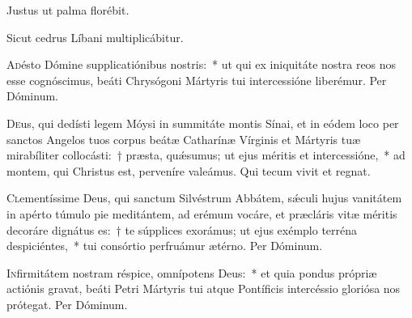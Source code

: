 \documentclass[vesperale_romanum]{subfiles}
\begin{document}



\vv Justus ut palma florébit.

\rr Sicut cedrus Líbani multiplicábitur.



\oratio
\lettrine{A}{d}ésto Dómine supplicatiónibus nostris:~* ut qui ex iniquitáte nostra reos nos esse cognóscimus, beáti Chrysógoni Mártyris tui intercessióne liberémur.
Per Dóminum.

\capitdeseq
 
\myrule


\duplex

\oratio

\lettrine{D}{e}us, qui dedísti legem Móysi in summitáte montis Sínai, et in eódem loco per sanctos Angelos tuos corpus beátæ Catharínæ Vírginis et Mártyris tuæ mirabíliter collocásti:~† præsta, quǽsumus; ut ejus méritis et intercessióne,~* ad montem, qui Christus est, perveníre valeámus. Qui tecum vivit et regnat.

\myrule


\duplex

\oratio

\lettrine{C}{l}ementíssime Deus, qui sanctum Silvéstrum Abbátem, sǽculi hujus vanitátem in apérto túmulo pie meditántem, ad erémum vocáre, et præcláris vitæ méritis decoráre dignátus es:~† te súpplices exorámus; ut ejus exémplo terréna despiciéntes,~* tui consórtio perfruámur ætérno.
Per Dóminum.



\oratio

\lettrine{I}{n}firmitátem nostram réspice, omnípotens Deus:~* et quia pondus própriæ actiónis gravat, beáti Petri Mártyris tui atque Pontíficis intercéssio gloriósa nos prótegat.
Per Dóminum.
\end{document}
